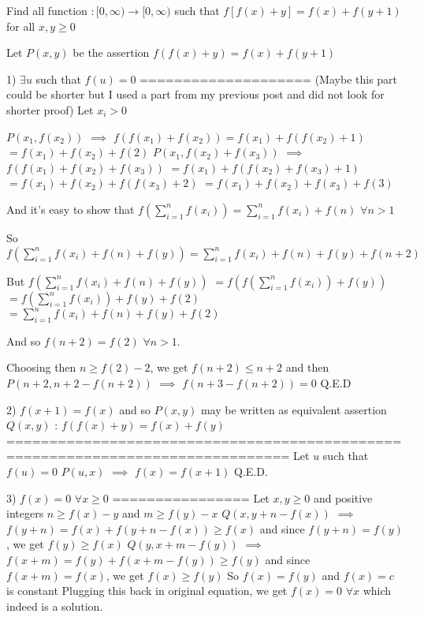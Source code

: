 \begin{solution}
	\begin{tcolorbox}Find all function $: [0,\infty) \rightarrow [0,\infty)$ such that $ f[f(x)+y] = f(x) + f(y+1) $ for all $ x,y \ge 0 $\end{tcolorbox}
Let $P(x,y)$ be the assertion $f(f(x)+y)=f(x)+f(y+1)$

1) $\exists u$ such that $f(u)=0$
====================
(Maybe this part could be shorter but I used a part from my previous post and did not look for shorter proof)
Let $x_i>0$

$P(x_1,f(x_2))$ $\implies$ $f(f(x_1)+f(x_2))=f(x_1)+f(f(x_2)+1)$ $=f(x_1)+f(x_2)+f(2)$
$P(x_1,f(x_2)+f(x_3))$ $\implies$ $f(f(x_1)+f(x_2)+f(x_3))$ $=f(x_1)+f(f(x_2)+f(x_3)+1)$ $=f(x_1)+f(x_2)+f(f(x_3)+2)$ $=f(x_1)+f(x_2)+f(x_3)+f(3)$

And it's easy to show that $f(\sum_{i=1}^n f(x_i))=\sum_{i=1}^n f(x_i)+f(n)$ $\forall n>1$

So $f(\sum_{i=1}^n f(x_i)+f(n)+f(y))=\sum_{i=1}^n f(x_i)+f(n)+f(y)+f(n+2)$

But $f(\sum_{i=1}^n f(x_i)+f(n)+f(y))$ $=f(f(\sum_{i=1}^n f(x_i))+f(y))$ $=f(\sum_{i=1}^n f(x_i))+f(y)+f(2)$ $=\sum_{i=1}^n f(x_i)+f(n)+f(y)+f(2)$

And so $f(n+2)=f(2)$ $\forall n>1$.

Choosing then $n\ge f(2)-2$, we get $f(n+2)\le n+2$ and then $P(n+2,n+2-f(n+2))$ $\implies$ $f(n+3-f(n+2))=0$ 
Q.E.D

2) $f(x+1)=f(x)$ and so $P(x,y)$ may be written as equivalent assertion $Q(x,y)$ : $f(f(x)+y)=f(x)+f(y)$
===============================================================================
Let $u$ such that $f(u)=0$
$P(u,x)$ $\implies$ $f(x)=f(x+1)$
Q.E.D.

3) $f(x)=0$ $\forall x\ge 0$
================
Let $x,y\ge 0$ and positive integers $n\ge f(x)-y$ and $m\ge f(y)-x$
$Q(x,y+n-f(x))$ $\implies$ $f(y+n)=f(x)+f(y+n-f(x))\ge f(x)$ and since $f(y+n)=f(y)$, we get $f(y)\ge f(x)$
$Q(y,x+m-f(y))$ $\implies$ $f(x+m)=f(y)+f(x+m-f(y))\ge f(y)$ and since $f(x+m)=f(x)$, we get $f(x)\ge f(y)$
So $f(x)=f(y)$ and $f(x)=c$ is constant
Plugging this back in original equation, we get $\boxed{f(x)=0}$ $\forall x$ which indeed is a solution.
\end{solution}




